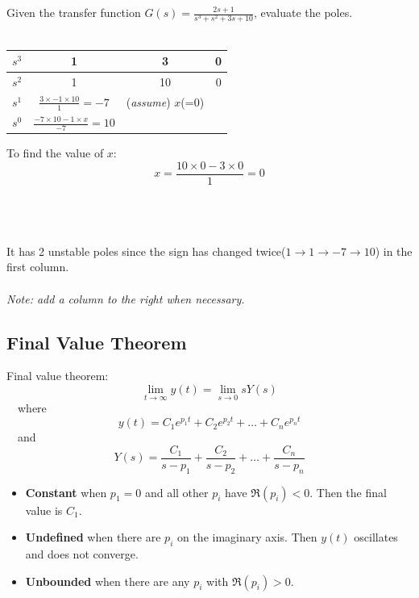 \begin{ex}{}
Given the transfer function $\displaystyle G(s) = \frac{2s+1}{s^{3}+s^{2}+3s+10}$, evaluate the poles.\\\\
\begin{minipage}{0.5\textwidth}
\renewcommand{\arraystretch}{1.3}
    \begin{table}[H]
        \begin{tabular}{c|c|c|c}
            $s^{3}$&1&3&0\\ \hline
            $s^{2}$&1&10&0\\ \hline \hline
            $s^{1}$&$\frac{3\times -1\times 10}{1}=-7$&(\textit{assume}) $x$(=0)& \\ \hline 
            $s^{0}$&$\frac{-7\times 10 -1\times x}{-7}=10$&&\\ 
        \end{tabular}
    \end{table}
 \end{minipage} \hfill
 \begin{minipage}{0.4\textwidth}
    To find the value of $x$:
    \[x = \frac{10\times0-3\times0}{1}=0\]
 \end{minipage}\\\\\\
  It has 2 unstable poles since the sign has changed twice($1\to 1\to -7 \to 10$) in the first column.
  \ \\ \\
 \textit{Note: add a column to the right when necessary.}
\end{ex}


\subsection{Final Value Theorem}
Final value theorem:
\[\lim_{t\to \infty}y(t) = \lim_{s\to 0}sY(s)\]
\ \ where 
\[y(t) = C_{1}e^{p_{1}t} +  C_{2}e^{p_{2}t}+ \ldots +  C_{n}e^{p_{n}t}\]
\ \ and 
\[Y(s) = \frac{C_{1}}{s-p_{1}}+\frac{C_{2}}{s-p_{2}}+\ldots+\frac{C_{n}}{s-p_{n}}\]

\begin{itemize}
    \item \textbf{Constant} when $p_{1}=0$ and all other $p_{i}$ have $\Re (p_{i})<0$. Then the final value is $C_{1}$.
    
    \item \textbf{Undefined} when there are $p_{i}$ on the imaginary axis. Then $y(t)$ oscillates and does not converge.
    
    \item \textbf{Unbounded} when there are any $p_{i}$ with $\Re (p_{i})>0$.
\end{itemize}

